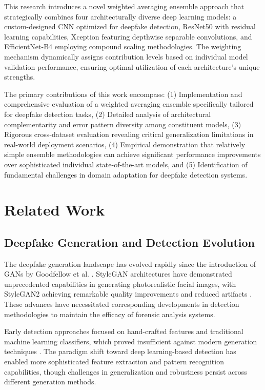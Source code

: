 \documentclass[conference]{IEEEtran}
\begin{document}
This research introduces a novel weighted averaging ensemble approach that strategically combines four architecturally diverse deep learning models: a custom-designed CNN optimized for deepfake detection, ResNet50 with residual learning capabilities, Xception featuring depthwise separable convolutions, and EfficientNet-B4 employing compound scaling methodologies. The weighting mechanism dynamically assigns contribution levels based on individual model validation performance, ensuring optimal utilization of each architecture's unique strengths.

The primary contributions of this work encompass: (1) Implementation and comprehensive evaluation of a weighted averaging ensemble specifically tailored for deepfake detection tasks, (2) Detailed analysis of architectural complementarity and error pattern diversity among constituent models, (3) Rigorous cross-dataset evaluation revealing critical generalization limitations in real-world deployment scenarios, (4) Empirical demonstration that relatively simple ensemble methodologies can achieve significant performance improvements over sophisticated individual state-of-the-art models, and (5) Identification of fundamental challenges in domain adaptation for deepfake detection systems.

\section{Related Work}

\subsection{Deepfake Generation and Detection Evolution}

The deepfake generation landscape has evolved rapidly since the introduction of GANs by Goodfellow et al. \cite{goodfellow2014generative}. StyleGAN architectures have demonstrated unprecedented capabilities in generating photorealistic facial images, with StyleGAN2 achieving remarkable quality improvements and reduced artifacts \cite{karras2019style}. These advances have necessitated corresponding developments in detection methodologies to maintain the efficacy of forensic analysis systems.

Early detection approaches focused on hand-crafted features and traditional machine learning classifiers, which proved insufficient against modern generation techniques \cite{verdoliva2020media}. The paradigm shift toward deep learning-based detection has enabled more sophisticated feature extraction and pattern recognition capabilities, though challenges in generalization and robustness persist across different generation methods.
\end{document}
